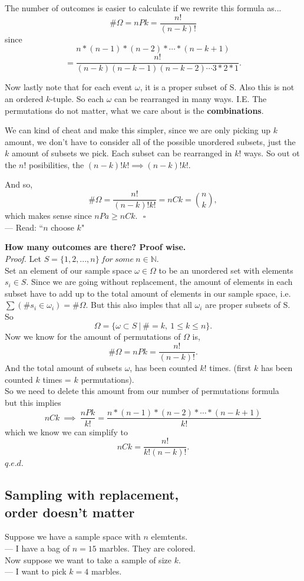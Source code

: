 \documentclass[12pt]{book}
\begin{document}
The number of outcomes is easier to calculate if we rewrite this formula as...
$$\#\Omega = nPk = \frac{n!}{(n-k)!}$$
since 
$$n*(n-1)*(n-2)* \cdots *(n-k+1)$$
$$ = \frac{n!}{(n-k)(n-k-1)(n-k-2)\cdots 3*2*1}.$$

Now lastly note that for each event $\omega$, it is a proper subset of S. Also this is not an ordered $k$-tuple. So each $\omega$ can be rearranged in many ways. I.E. The permutations do not matter, what we care about is the \textbf{combinations}.

We can kind of cheat and make this simpler, since we are only picking up $k$ amount, we don't have to consider all of the possible unordered subsets, just the $k$ amount of subsets we pick. Each subset can be rearranged in $k!$ ways. So out ot the $n!$ posibilities, the $(n-k)!k! \implies (n-k)!k!$.

\noindent And so, 
$$\#\Omega = \frac{n!}{(n-k)!k!} = nCk ={n \choose k},$$
which makes sense since $nPa \geq nCk.~~~\square$\\
--- Read: ``$n$ choose $k$"

\noindent \textbf{How many outcomes are there? Proof wise.}\\
\textit{Proof.}
Let $S=\{1,2,...,n\}~for~some~n\in \mathbb{N}$.\\
Set an element of our sample space $\omega \in \Omega$ to be an unordered set with elements $s_i\in S$. Since we are going without replacement, the amount of elements in each subset have to add up to the total amount of elements in our sample space, i.e. $\sum (\#s_i \in  \omega _i) = \#\Omega$. But this also imples that all $\omega_i$ are proper subsets of S. \\
So $$\Omega = \big\{  \omega \subset S ~\big|~ \# = k,~1\leq k \leq n  \big\}.$$
Now we know for the amount of permutations of $\Omega$ is,
$$ \#\Omega = nPk = \frac{n!}{(n-k)!}.$$
And the total amount of subsets $\omega$, has been counted $k!$ times. (first $k$ has been counted $k$ times = $k$ permutations). \\
So we need to delete this amount from our number of permutations formula\\
but this implies\\
$${nCk} ~\implies~{ \frac{nPk}{k!} = \frac{n*(n-1)*(n-2)* \cdots *(n-k+1)}{k!}}$$
which we know we can simplify to
$$nCk = \frac{n!}{k!(n-k)!}.$$\hfill$q.e.d.$





\subsection{Sampling with replacement,\\ order doesn't matter}
Suppose we have a sample space with $n$ elemtents. \\
--- I have a bag of $n=15$ marbles. They are colored.\\
Now suppose we want to take a sample of size $k$. \\
--- I want to pick $k=4$ marbles.\\
\end{document}

